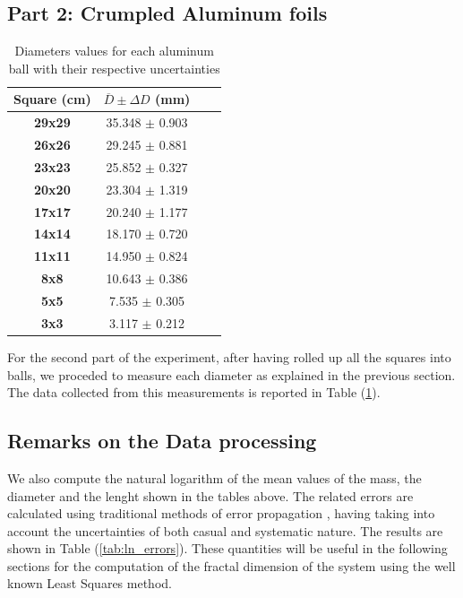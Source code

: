 \documentclass[a4paper,12pt]{article}
\begin{document}
\subsection{Part 2: Crumpled Aluminum foils}
\begin{table}[h!] 
    \centering
    \begin{tabular}{|c|c|c|c|}
    \hline
        \textbf{Square (cm)} & \( \overline{D} \pm \Delta D \) (mm) \\ \hline 
        \textbf{29x29} & 35.348 \(\pm\) 0.903              \\ \hline
        \textbf{26x26} & 29.245 \(\pm\) 0.881              \\ \hline
        \textbf{23x23} & 25.852 \(\pm\) 0.327              \\ \hline
        \textbf{20x20} & 23.304 \(\pm\) 1.319              \\ \hline
        \textbf{17x17} & 20.240 \(\pm\) 1.177              \\ \hline
        \textbf{14x14} & 18.170 \(\pm\) 0.720              \\ \hline
        \textbf{11x11} & 14.950 \(\pm\) 0.824              \\ \hline
        \textbf{8x8}   & 10.643 \(\pm\) 0.386              \\ \hline
        \textbf{5x5}   & 7.535  \(\pm\) 0.305              \\ \hline
        \textbf{3x3}   & 3.117 \(\pm\) 0.212               \\ \hline
    \end{tabular}
    \caption{Diameters values for each aluminum ball with their respective uncertainties}
    \label{tab:balls}
\end{table}

For the second part of the experiment, after having rolled up all the squares into balls, we proceded to measure each diameter as explained in the previous section. The data collected from this measurements is reported in Table (\ref{tab:balls}).




\subsection{Remarks on the Data processing} 
We also compute the natural logarithm of the mean values of the mass, the diameter and the lenght shown in the tables above. The related errors are calculated using traditional methods of error propagation \cite{taylor-1997}, having taking into account the uncertainties of both casual and systematic nature. The results are shown in Table (\ref{tab:ln_errors}). These quantities will be useful in the following sections for the computation of the fractal dimension of the system using the well known Least Squares method.
\end{document}
